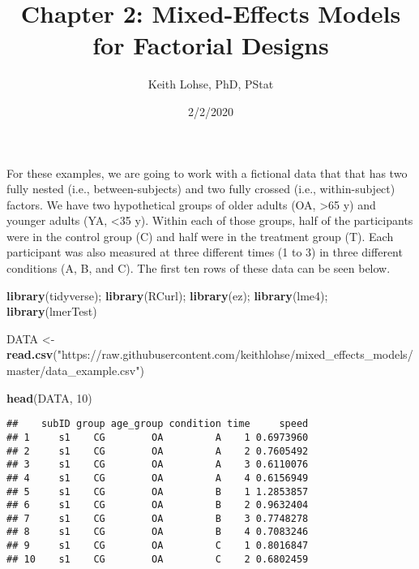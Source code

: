 \documentclass[]{article}
\title{Chapter 2: Mixed-Effects Models for Factorial Designs}
\author{Keith Lohse, PhD, PStat}
\date{2/2/2020}
\newenvironment{Shaded}{\begin{snugshade}}{\end{snugshade}}
\newcommand{\DecValTok}[1]{\textcolor[rgb]{0.00,0.00,0.81}{#1}}
\newcommand{\KeywordTok}[1]{\textcolor[rgb]{0.13,0.29,0.53}{\textbf{#1}}}
\newcommand{\NormalTok}[1]{#1}
\newcommand{\StringTok}[1]{\textcolor[rgb]{0.31,0.60,0.02}{#1}}
\begin{document}
\maketitle

For these examples, we are going to work with a fictional data that that
has two fully nested (i.e., between-subjects) and two fully crossed
(i.e., within-subject) factors. We have two hypothetical groups of older
adults (OA, \textgreater65 y) and younger adults (YA, \textless35 y).
Within each of those groups, half of the participants were in the
control group (C) and half were in the treatment group (T). Each
participant was also measured at three different times (1 to 3) in three
different conditions (A, B, and C). The first ten rows of these data can
be seen below.

\begin{Shaded}
\begin{Highlighting}[]
\KeywordTok{library}\NormalTok{(tidyverse); }\KeywordTok{library}\NormalTok{(RCurl); }\KeywordTok{library}\NormalTok{(ez); }\KeywordTok{library}\NormalTok{(lme4); }\KeywordTok{library}\NormalTok{(lmerTest)}

\NormalTok{DATA <{-}}\StringTok{ }\KeywordTok{read.csv}\NormalTok{(}\StringTok{"https://raw.githubusercontent.com/keithlohse/mixed\_effects\_models/master/data\_example.csv"}\NormalTok{)}
\end{Highlighting}
\end{Shaded}

\begin{Shaded}
\begin{Highlighting}[]
\KeywordTok{head}\NormalTok{(DATA, }\DecValTok{10}\NormalTok{)}
\end{Highlighting}
\end{Shaded}

\begin{verbatim}
##    subID group age_group condition time     speed
## 1     s1    CG        OA         A    1 0.6973960
## 2     s1    CG        OA         A    2 0.7605492
## 3     s1    CG        OA         A    3 0.6110076
## 4     s1    CG        OA         A    4 0.6156949
## 5     s1    CG        OA         B    1 1.2853857
## 6     s1    CG        OA         B    2 0.9632404
## 7     s1    CG        OA         B    3 0.7748278
## 8     s1    CG        OA         B    4 0.7083246
## 9     s1    CG        OA         C    1 0.8016847
## 10    s1    CG        OA         C    2 0.6802459
\end{verbatim}
\end{document}
